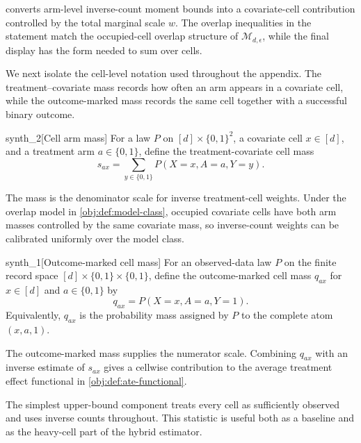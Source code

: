  converts arm-level inverse-count moment bounds into a covariate-cell contribution controlled by the total marginal scale \(w\). The overlap inequalities in the statement match the occupied-cell overlap structure of \(\mathcal M_{d,\epsilon}\), while the final display has the form needed to sum over cells.

We next isolate the cell-level notation used throughout the appendix. The treatment--covariate mass records how often an arm appears in a covariate cell, while the outcome-marked mass records the same cell together with a successful binary outcome.

\begin{definitionv}{synth_2}[Cell arm mass]
For a law \(P\) on \([d]\times\{0,1\}^2\), a covariate cell \(x\in[d]\), and a treatment arm \(a\in\{0,1\}\), define the treatment-covariate cell mass
\[
s_{ax}
=
\sum_{y\in\{0,1\}} P(X=x,A=a,Y=y).
\]
\end{definitionv}

The mass  is the denominator scale for inverse treatment-cell weights. Under the overlap model in \cref{obj:def:model-class}, occupied covariate cells have both arm masses controlled by the same covariate mass, so inverse-count weights can be calibrated uniformly over the model class.

\begin{definitionv}{synth_1}[Outcome-marked cell mass]
For an observed-data law \(P\) on the finite record space \([d]\times\{0,1\}\times\{0,1\}\), define the outcome-marked cell mass \(q_{ax}\) for \(x\in[d]\) and \(a\in\{0,1\}\) by
\[
q_{ax}
=
P(X=x,A=a,Y=1).
\]
Equivalently, \(q_{ax}\) is the probability mass assigned by \(P\) to the complete atom \((x,a,1)\).
\end{definitionv}

The outcome-marked mass  supplies the numerator scale. Combining \(q_{ax}\) with an inverse estimate of \(s_{ax}\) gives a cellwise contribution to the average treatment effect functional in \cref{obj:def:ate-functional}.

The simplest upper-bound component treats every cell as sufficiently observed and uses inverse counts throughout. This statistic is useful both as a baseline and as the heavy-cell part of the hybrid estimator.

